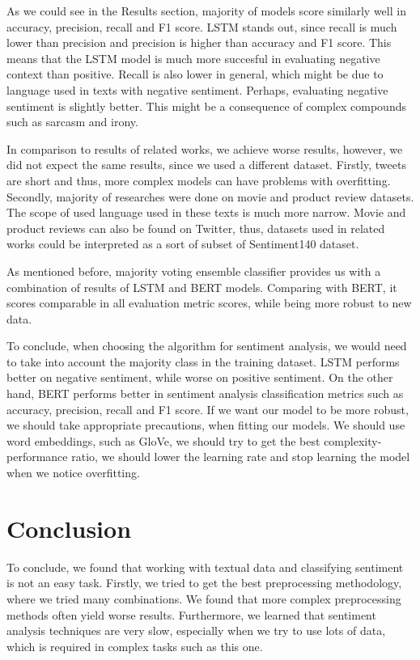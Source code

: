 \documentclass[conference]{IEEEtran}
\begin{document}
As we could see in the Results section, majority of models score similarly well in accuracy, precision, recall and F1 score. LSTM stands out, since recall is much lower than precision and precision is higher than accuracy and F1 score. This means that the LSTM model is much more succesful in evaluating negative context than positive. Recall is also lower in general, which might be due to language used in texts with negative sentiment. Perhaps, evaluating negative sentiment is slightly better. This might be a consequence of complex compounds such as sarcasm and irony.

In comparison to results of related works, we achieve worse results, however, we did not expect the same results, since we used a different dataset. Firstly, tweets are short and thus, more complex models can have problems with overfitting. Secondly, majority of researches were done on movie and product review datasets. The scope of used language used in these texts is much more narrow. Movie and product reviews can also be found on Twitter, thus, datasets used in related works could be interpreted as a sort of subset of Sentiment140 dataset.

As mentioned before, majority voting ensemble classifier provides us with a combination of results of LSTM and BERT models. Comparing with BERT, it scores comparable in all evaluation metric scores, while being more robust to new data. 

To conclude, when choosing the algorithm for sentiment analysis, we would need to take into account the majority class in the training dataset. LSTM performs better on negative sentiment, while worse on positive sentiment. On the other hand, BERT performs better in sentiment analysis classification metrics such as accuracy, precision, recall and F1 score. If we want our model to be more robust, we should take appropriate precautions, when fitting our models.
We should use word embeddings, such as GloVe, we should try to get the best complexity-performance ratio, we should lower the learning rate and stop learning the model when we notice overfitting.

\section{Conclusion}
To conclude, we found that working with textual data and classifying sentiment is not an easy task. Firstly, we tried to get the best preprocessing methodology, where we tried many combinations. We found that more complex preprocessing methods often yield worse results. Furthermore, we learned that sentiment analysis techniques are very slow, especially when we try to use lots of data, which is required in complex tasks such as this one.
\end{document}
